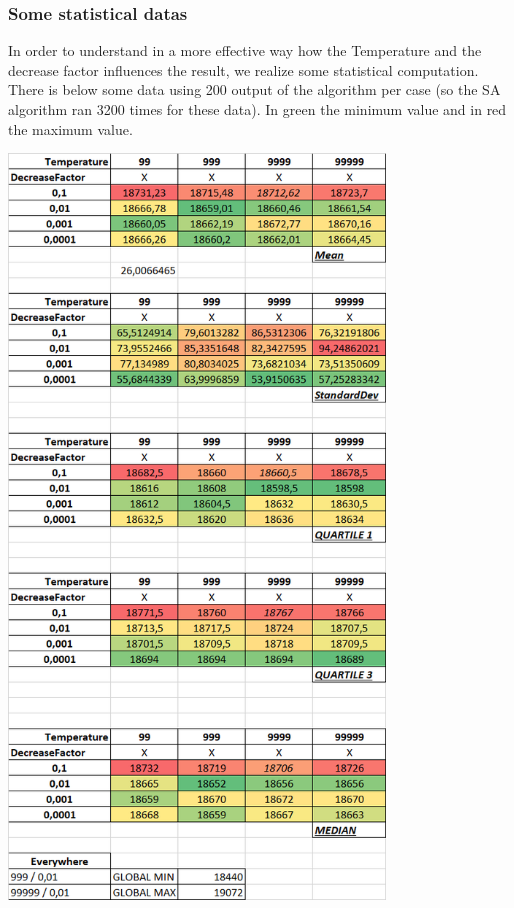 \documentclass[11pt]{article}
\begin{document}
\hypertarget{some-statistical-datas}{%
\subsubsection{Some statistical datas}\label{some-statistical-datas}}

In order to understand in a more effective way how the Temperature and
the decrease factor influences the result, we realize some statistical
computation. There is below some data using 200 output of the algorithm
per case (so the SA algorithm ran 3200 times for these data). In green
the minimum value and in red the maximum value.

\begin{center}
\includegraphics[width=10cm]{images/sa_datas}
\end{center}
\end{document}
